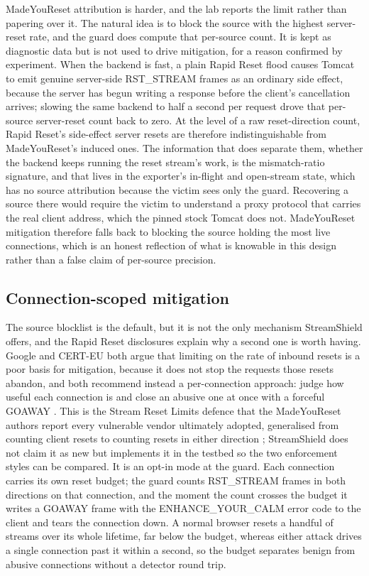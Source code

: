 \documentclass[a4paper,fleqn]{cas-dc}
\begin{document}
MadeYouReset attribution is harder, and the lab reports the limit rather than papering over it. The natural idea is to block the source with the highest server-reset rate, and the guard does compute that per-source count. It is kept as diagnostic data but is not used to drive mitigation, for a reason confirmed by experiment. When the backend is fast, a plain Rapid Reset flood causes Tomcat to emit genuine server-side RST\_STREAM frames as an ordinary side effect, because the server has begun writing a response before the client's cancellation arrives; slowing the same backend to half a second per request drove that per-source server-reset count back to zero. At the level of a raw reset-direction count, Rapid Reset's side-effect server resets are therefore indistinguishable from MadeYouReset's induced ones. The information that does separate them, whether the backend keeps running the reset stream's work, is the mismatch-ratio signature, and that lives in the exporter's in-flight and open-stream state, which has no source attribution because the victim sees only the guard. Recovering a source there would require the victim to understand a proxy protocol that carries the real client address, which the pinned stock Tomcat does not. MadeYouReset mitigation therefore falls back to blocking the source holding the most live connections, which is an honest reflection of what is knowable in this design rather than a false claim of per-source precision.

\subsection{Connection-scoped mitigation}\label{sec:inline-mitigation}

The source blocklist is the default, but it is not the only mechanism StreamShield offers, and the Rapid Reset disclosures explain why a second one is worth having. Google and CERT-EU both argue that limiting on the rate of inbound resets is a poor basis for mitigation, because it does not stop the requests those resets abandon, and both recommend instead a per-connection approach: judge how useful each connection is and close an abusive one at once with a forceful GOAWAY \cite{googleRapidReset,certeu}. This is the Stream Reset Limits defence that the MadeYouReset authors report every vulnerable vendor ultimately adopted, generalised from counting client resets to counting resets in either direction \cite{madeyouresetPaper}; StreamShield does not claim it as new but implements it in the testbed so the two enforcement styles can be compared. It is an opt-in mode at the guard. Each connection carries its own reset budget; the guard counts RST\_STREAM frames in both directions on that connection, and the moment the count crosses the budget it writes a GOAWAY frame with the ENHANCE\_YOUR\_CALM error code to the client and tears the connection down. A normal browser resets a handful of streams over its whole lifetime, far below the budget, whereas either attack drives a single connection past it within a second, so the budget separates benign from abusive connections without a detector round trip.
\end{document}
